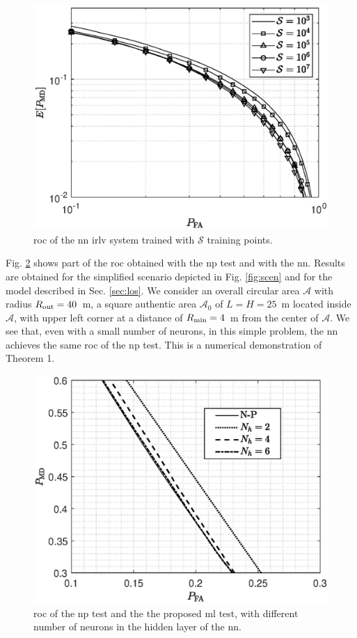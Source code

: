 \documentclass[conference,final]{IEEEtran}
\begin{document}
\begin{figure}[t]
    \centering
    \includegraphics[width=1\columnwidth]{res_avg_nTrain.eps}
    \caption{\ac{roc} of the \ac{nn} \ac{irlv} system trained with $\mathcal{S}$ training points.}
    \label{fig:n_train}
\end{figure}


Fig. \ref{fig:NP_comp} shows part of the \ac{roc} obtained with the \ac{np} test and with the \ac{nn}. Results are obtained for the simplified scenario depicted in Fig. \ref{fig:scen} and for the model described in Sec. \ref{sec:los}. We consider an overall circular area $\mathcal{A}$ with radius $R_{\rm out} = 40$~m, a square authentic area $\mathcal{A}_0$ of $L = H= 25$~m located inside $\mathcal{A}$, with upper left corner at a distance of $R_{\rm min} = 4$~m from the center of $\mathcal{A}$. We see that, even with a small number of neurons, in this simple problem, the \ac{nn} achieves the same \ac{roc} of the \ac{np} test. This is a numerical demonstration of Theorem 1.

 
 \begin{figure}[h]
     \centering
     \includegraphics[width=0.9\columnwidth]{FA_MD_LOS.eps}
     \caption{\ac{roc} of the \ac{np} test and the the proposed \ac{ml} test,  with different number of neurons in the hidden layer of the \ac{nn}.}
     \label{fig:NP_comp}
 \end{figure}
\end{document}
